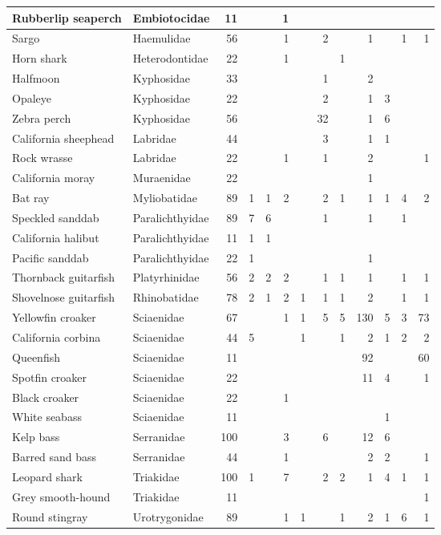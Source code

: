 \documentclass[]{article}
\begin{document}
\begin{table}[H]
\begin{tabular}{l|l|r|r|r|r|r|r|r|r|r|r|r}
\hline
Rubberlip seaperch & Embiotocidae & 11 &  &  & 1 &  &  &  &  &  &  & \\
\hline
Sargo & Haemulidae & 56 &  &  & 1 &  & 2 &  & 1 &  & 1 & 1\\
\hline
Horn shark & Heterodontidae & 22 &  &  & 1 &  &  & 1 &  &  &  & \\
\hline
Halfmoon & Kyphosidae & 33 &  &  &  &  & 1 &  & 2 &  &  & \\
\hline
Opaleye & Kyphosidae & 22 &  &  &  &  & 2 &  & 1 & 3 &  & \\
\hline
Zebra perch & Kyphosidae & 56 &  &  &  &  & 32 &  & 1 & 6 &  & \\
\hline
California sheephead & Labridae & 44 &  &  &  &  & 3 &  & 1 & 1 &  & \\
\hline
Rock wrasse & Labridae & 22 &  &  & 1 &  & 1 &  & 2 &  &  & 1\\
\hline
California moray & Muraenidae & 22 &  &  &  &  &  &  & 1 &  &  & \\
\hline
Bat ray & Myliobatidae & 89 & 1 & 1 & 2 &  & 2 & 1 & 1 & 1 & 4 & 2\\
\hline
Speckled sanddab & Paralichthyidae & 89 & 7 & 6 &  &  & 1 &  & 1 &  & 1 & \\
\hline
California halibut & Paralichthyidae & 11 & 1 & 1 &  &  &  &  &  &  &  & \\
\hline
Pacific sanddab & Paralichthyidae & 22 & 1 &  &  &  &  &  & 1 &  &  & \\
\hline
Thornback guitarfish & Platyrhinidae & 56 & 2 & 2 & 2 &  & 1 & 1 & 1 &  & 1 & 1\\
\hline
Shovelnose guitarfish & Rhinobatidae & 78 & 2 & 1 & 2 & 1 & 1 & 1 & 2 &  & 1 & 1\\
\hline
Yellowfin croaker & Sciaenidae & 67 &  &  & 1 & 1 & 5 & 5 & 130 & 5 & 3 & 73\\
\hline
California corbina & Sciaenidae & 44 & 5 &  &  & 1 &  & 1 & 2 & 1 & 2 & 2\\
\hline
Queenfish & Sciaenidae & 11 &  &  &  &  &  &  & 92 &  &  & 60\\
\hline
Spotfin croaker & Sciaenidae & 22 &  &  &  &  &  &  & 11 & 4 &  & 1\\
\hline
Black croaker & Sciaenidae & 22 &  &  & 1 &  &  &  &  &  &  & \\
\hline
White seabass & Sciaenidae & 11 &  &  &  &  &  &  &  & 1 &  & \\
\hline
Kelp bass & Serranidae & 100 &  &  & 3 &  & 6 &  & 12 & 6 &  & \\
\hline
Barred sand bass & Serranidae & 44 &  &  & 1 &  &  &  & 2 & 2 &  & 1\\
\hline
Leopard shark & Triakidae & 100 & 1 &  & 7 &  & 2 & 2 & 1 & 4 & 1 & 1\\
\hline
Grey smooth-hound & Triakidae & 11 &  &  &  &  &  &  &  &  &  & 1\\
\hline
Round stingray & Urotrygonidae & 89 &  &  & 1 & 1 &  & 1 & 2 & 1 & 6 & 1\\
\hline
\end{tabular}
\end{table}
\end{document}
